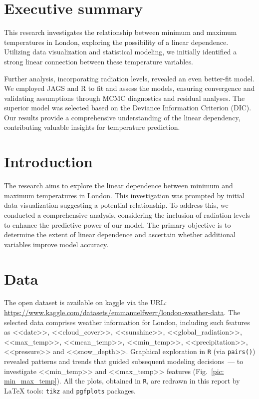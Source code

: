 \documentclass{mathreport}
\begin{document}
\newpage
\section{Executive summary} 

This research investigates the relationship between minimum and maximum temperatures in London, exploring the possibility of a linear dependence. Utilizing data visualization and statistical modeling, we initially identified a strong linear connection between these temperature variables. 

Further analysis, incorporating radiation levels, revealed an even better-fit model. We employed JAGS and R to fit and assess the models, ensuring convergence and validating assumptions through MCMC diagnostics and residual analyses. The superior model was selected based on the Deviance Information Criterion (DIC). Our results provide a comprehensive understanding of the linear dependency, contributing valuable insights for temperature prediction.

\section{Introduction} 

The research aims to explore the linear dependence between minimum and maximum temperatures in London. This investigation was prompted by initial data visualization suggesting a potential relationship. To address this, we conducted a comprehensive analysis, considering the inclusion of radiation levels to enhance the predictive power of our model. The primary objective is to determine the extent of linear dependence and ascertain whether additional variables improve model accuracy.

\section{Data} 

The open dataset is available on kaggle via the URL: \url{https://www.kaggle.com/datasets/emmanuelfwerr/london-weather-data}. The selected data comprises weather information for London, including such features as <<date>>, <<cloud\_cover>>, <<sunshine>>, <<global\_radiation>>, <<max\_temp>>, <<mean\_temp>>, <<min\_temp>>, <<precipitation>>, <<pressure>> and <<snow\_depth>>. Graphical exploration in \texttt{R} (via \texttt{pairs()}) revealed patterns and trends that guided subsequent modeling decisions~--- to investigate <<min\_temp>> and <<max\_temp>> features (Fig.~\ref{pic: min_max_temp}). All the plots, obtained in \texttt{R}, are redrawn in this report by \LaTeX{} tools: \texttt{tikz} and \texttt{pgfplots} packages.
\end{document}

